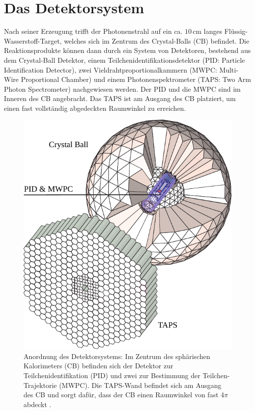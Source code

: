 \documentclass[a4paper,11pt,oneside,final,german,openbib,pdftex]{scrbook}
\begin{document}
{\section{Das Detektorsystem}
\label{sec:Das-Detektorsystem}
Nach seiner Erzeugung trifft der Photonenstrahl auf ein ca. $10\,\text{cm}$ langes Flüssig-Wasserstoff-Target, welches sich im Zentrum des Crystal-Balls (CB) befindet. Die Reaktionsprodukte können dann durch ein System von Detektoren, bestehend aus dem Crystal-Ball Detektor, einem Teilchenidentifikationsdetektor (PID: Particle Identification Detector), zwei Vieldrahtproportionalkammern (MWPC: Multi-Wire Proportional Chamber) und einem Photonenspektrometer (TAPS: Two Arm Photon Spectrometer) nachgewiesen werden. Der PID und die MWPC sind im Inneren des CB angebracht. Das TAPS ist am Ausgang des CB platziert, um einen fast vollständig abgedeckten Raumwinkel zu erreichen.
\begin{figure}[h!]
	\begin{center}
		\includegraphics{crystal_ball}
	
		\caption[Anordnung des Detektorsystems] {Anordnung des Detektorsystems: Im Zentrum des sph\"arischen Kalorimeters (CB) befinden sich der Detektor zur Teilchenidentifikation (PID) und zwei zur Bestimmung der Teilchen-Trajektorie (MWPC). Die TAPS-Wand befindet sich am Ausgang des CB und sorgt daf\"ur, dass der CB einen Raumwinkel von fast 4$\pi$ abdeckt \cite{We13}.}
		\label{[fig.crystal_ball]}	
\end{center}
\end{figure}

}
\end{document}
